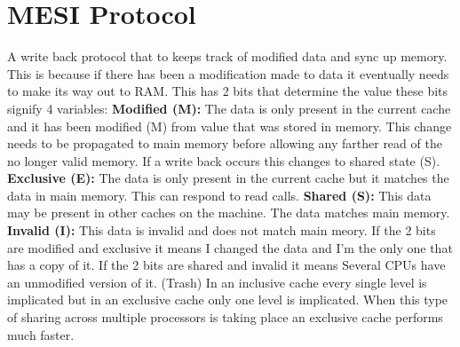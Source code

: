 \documentclass[twoside]{article}
\begin{document}
\section{MESI Protocol} 
A write back protocol that to keeps track of modified data and sync up memory.  This is because if there has been a modification made to data it eventually needs to make its way out to RAM. This has 2 bits that determine the value these bits signify 4 variables:
\newline
\textbf{Modified (M):} The data is only present in the current cache and it has been modified (M) from value that was stored in memory. This change needs to be propagated to main memory before allowing any farther read of the no longer valid memory. If a write back occurs this changes to shared state (S).
\newline
\textbf{Exclusive (E):} The data is only present in the current cache but it matches the data in main memory. This can respond to read calls.
\newline
\textbf{Shared (S):} This data may be present in other caches on the machine. The data matches main memory.
\newline
\textbf{Invalid (I):} This data is invalid and does not match main meory.
\newline
If the 2 bits are modified and exclusive it means I changed the data and I'm the only one that has a copy of it.
\newline
If the 2 bits are shared and invalid it means Several CPUs have an unmodified version of it. (Trash)
\newline
In an inclusive cache every single level is implicated but in an exclusive cache only one level is implicated. When this type of sharing across multiple processors is taking place an exclusive cache performs much faster.
\end{document}
